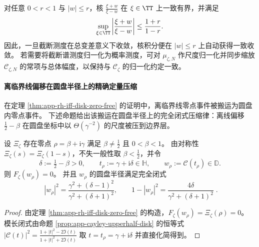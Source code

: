 \begin{remark}\label{rem:app-horizon-trunc-kernel-bound}
对任意 \(0<r<1\) 与 \(|w|\le r\)，核 \(\frac{\xi+w}{\xi-w}\) 在 \(\xi\in\TT\) 上一致有界，并满足
\[
\sup_{\xi\in\TT}\left|\frac{\xi+w}{\xi-w}\right|\le \frac{1+r}{1-r}.
\]
因此，一旦截断测度在总变差意义下收敛，核积分便在 \(|w|\le r\) 上自动获得一致收敛。
若需要将截断谱测度归一化为概率测度，可对 \(\mu_{\zeta,N}\) 作尺度归一化并同步缩放 \(\mathscr{C}_{\zeta,N}\) 的常项与总体幅度，以保持与 \(\mathscr{C}_{\zeta}\) 的归一化约定一致。
\end{remark}

\paragraph{离临界线偏移在圆盘半径上的精确定量压缩}
在定理 \ref{thm:app-rh-iff-disk-zero-free} 的证明中，离临界线零点事件被搬运为圆盘内零点事件。
下述命题给出该搬运在圆盘半径上的完全闭式压缩律：离线偏移 \(\tfrac12-\beta\) 在圆盘坐标中以 \(\Theta(\gamma^{-2})\) 的尺度被压到边界层。

\begin{proposition}[离临界线偏移的圆盘半径闭式压缩]\label{prop:app-offcritical-radius-compression}
设 \(\Xi_{\zeta}\) 存在零点 \(\rho=\beta+\mathrm{i}\gamma\) 满足 \(\beta\neq\tfrac12\) 且 \(0<\beta<1\)。
由对称性 \(\Xi_{\zeta}(s)=\Xi_{\zeta}(1-s)\)，不失一般性取 \(\beta<\tfrac12\)，并令
\[
\delta:=\tfrac12-\beta>0,
\qquad
t_{\rho}:=\gamma+\mathrm{i}\delta\in\mathbb{H},
\qquad
w_{\rho}:=\mathcal{C}(t_{\rho})\in\mathbb{D}.
\]
则 \(F_{\zeta}(w_{\rho})=0\)。
并且 \(w_{\rho}\) 的圆盘半径满足完全闭式
\begin{equation}\label{eq:app-offcritical-radius-closed}
\boxed{\;
|w_{\rho}|^{2}
=\frac{\gamma^{2}+(\delta-1)^{2}}{\gamma^{2}+(\delta+1)^{2}},
\qquad
1-|w_{\rho}|^{2}
=\frac{4\delta}{\gamma^{2}+(\delta+1)^{2}}\; }.
\end{equation}
\end{proposition}
\begin{proof}
由定理 \ref{thm:app-rh-iff-disk-zero-free} 的构造，\(F_{\zeta}(w_{\rho})=\Xi_{\zeta}(\rho)=0\)。
模长闭式由命题 \ref{prop:app-cayley-upperhalf-disk} 的恒等式
\(
|\mathcal{C}(t)|^{2}=\frac{1+|t|^{2}-2\Im(t)}{1+|t|^{2}+2\Im(t)}
\)
取 \(t=t_{\rho}=\gamma+\mathrm{i}\delta\) 并直接化简得到。
\end{proof}

